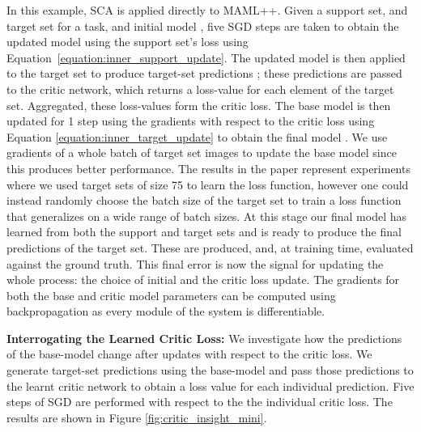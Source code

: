 \documentclass{article} \usepackage[dvipsnames]{xcolor}
\begin{document}
 In this example, SCA is applied directly to MAML++. Given a support set,  and target set  for a task, and initial model , five SGD steps are taken to obtain the updated model  using the support set's loss using Equation~\ref{equation:inner_support_update}. The updated model is then applied to the target set to produce target-set predictions ; these predictions are passed to the critic network, which returns a loss-value for each element of the target set. Aggregated, these loss-values form the critic loss. The base model  is then updated for 1 step using the gradients with respect to the critic loss using Equation \ref{equation:inner_target_update} to obtain the final model . We use gradients of a whole batch of target set images to update the base model since this produces better performance. The results in the paper represent experiments where we used target sets of size 75 to learn the loss function, however one could instead randomly choose the batch size of the target set to train a loss function that generalizes on a wide range of batch sizes.
At this stage our final model has learned from both the support and target sets and is ready to produce the final predictions of the target set. These are produced, and, at training time, evaluated against the ground truth. This final error is now the signal for updating the whole process: the choice of initial  and the critic loss update. The gradients for both the base and critic model parameters can be computed using backpropagation as every module of the system is differentiable. 
 
\textbf{Interrogating the Learned Critic Loss:}
We investigate how the predictions of the base-model change after updates with respect to the critic loss. We generate target-set predictions using the base-model  and pass those predictions to the learnt critic network to obtain a loss value for each individual prediction. Five steps of SGD are performed with respect to the the individual critic loss. The results are shown in Figure \ref{fig:critic_insight_mini}.
\end{document}
